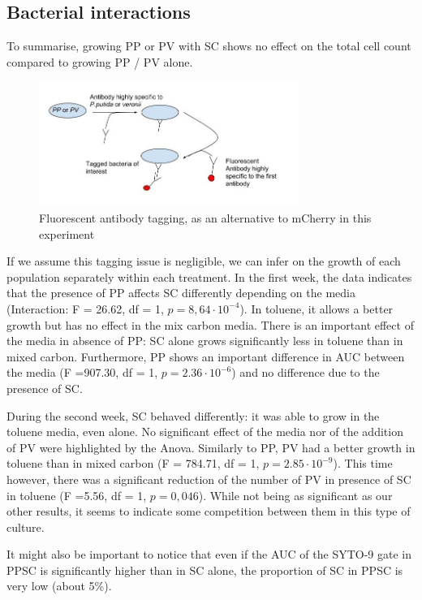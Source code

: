 \documentclass[a4paper, 10pt, conference]{ieeeconf}   %
\begin{document}
\subsection{Bacterial interactions}
To summarise, growing PP or PV with SC shows no effect on the total cell count compared to growing PP / PV alone. 
\begin{figure}[H]
	\centering
	
	\includegraphics[width=8.5cm]{antibodytag.jpg}
	\caption{Fluorescent antibody tagging, as an alternative to mCherry in this experiment}
	\label{antibody}
	
\end{figure}
If we assume this tagging issue is negligible, we can infer on the growth of each population separately within each treatment. In the first week, the data indicates that the presence of PP affects SC differently depending on the media (Interaction: F = 26.62, df = 1, $p = 8,64 \cdot 10^{-4}$).  In toluene, it allows a better growth but has no effect in the mix carbon media.  There is an important effect of the media in absence of PP: SC alone grows significantly less in toluene than in mixed carbon. Furthermore, PP shows an important difference in AUC between the media (F =907.30, df = 1, $p = 2.36 \cdot 10^{-6}$) and no difference due to the presence of SC.  

During the second week, SC behaved differently: it was able to grow in the toluene media, even alone. No significant effect of the media nor of the addition of PV were highlighted by the Anova. 
Similarly to PP, PV had a better growth in toluene than in mixed carbon (F = 784.71, df = 1,
$p = 2.85 \cdot 10^{-9}$). This time however, there was a significant reduction of the number of PV in presence of SC in toluene (F =5.56, df = 1, $p = 0,046$). While not being as significant as our other results, it seems to indicate some competition between them in this type of culture.

It might also be important to notice that even if the AUC of the SYTO-9 gate in PPSC is significantly higher than in SC alone, the proportion of SC in PPSC is very low (about 5\%).
\end{document}
